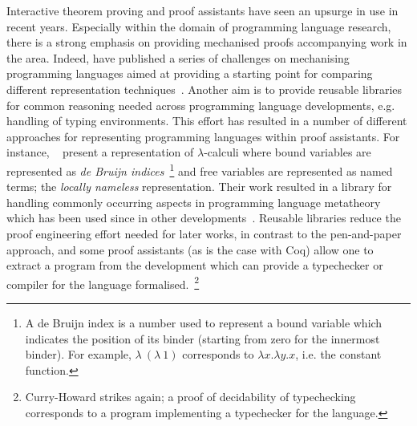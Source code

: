 \documentclass{mprop}
\newcommand{\1}{\textbf{1}\xspace}
\begin{document}
Interactive theorem proving and proof assistants have seen an upsurge in use
in recent years. Especially within the domain of programming language
research, there is a strong emphasis on providing mechanised proofs
accompanying work in the area. Indeed, \citeauthor{Aydemir:2005:MMM} have
published a series of challenges on mechanising programming languages aimed at
providing a starting point for comparing different representation
techniques~\cite{Aydemir:2005:MMM}. Another aim is to provide reusable
libraries for common reasoning needed across programming language
developments, e.g. handling of typing environments. This effort has resulted
in a number of different approaches for representing programming languages
within proof assistants. For instance,
\citeauthor{Aydemir:2008:EFM}~\cite{Aydemir:2008:EFM} present a representation
of $\lambda$-calculi where bound variables are represented as \textit{de
  Bruijn indices}~\footnote{A de Bruijn index is a number used to represent a
  bound variable which indicates the position of its binder (starting from
  zero for the innermost binder). For example, $\lambda~(\lambda~1)$
  corresponds to $\lambda x. \lambda y. x$, i.e. the constant function.} and
free variables are represented as named terms; the \textit{locally nameless}
representation. Their work resulted in a library for handling commonly
occurring aspects in programming language metatheory which has been used since
in other developments~\cite{Park:2014:MMW}. Reusable libraries reduce the
proof engineering effort needed for later works, in contrast to the
pen-and-paper approach, and some proof assistants (as is the case with Coq)
allow one to extract a program from the development which can provide a
typechecker or compiler for the language formalised.~\footnote{Curry-Howard
  strikes again; a proof of decidability of typechecking corresponds to a
  program implementing a typechecker for the language.}
\end{document}
